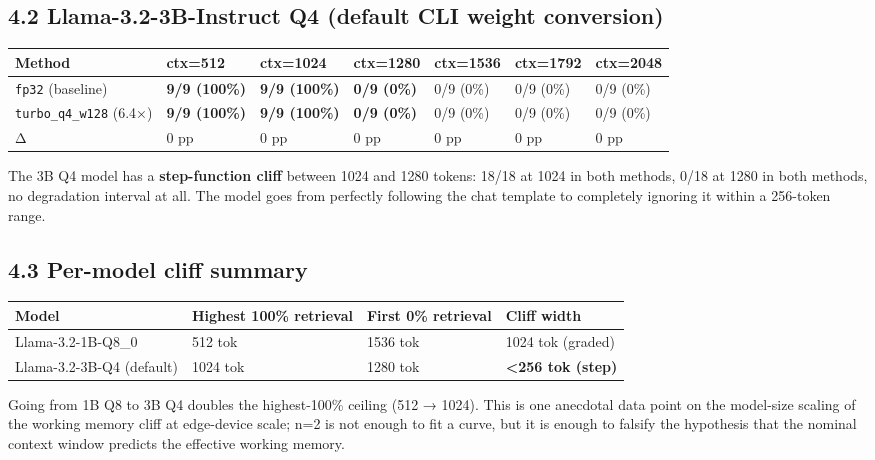 \documentclass[11pt]{article}
\begin{document}
\subsection*{4.2 Llama-3.2-3B-Instruct Q4 (default CLI weight conversion)}


\begin{center}
\begin{tabular}{lllllll}
\toprule
Method & ctx=512 & ctx=1024 & ctx=1280 & ctx=1536 & ctx=1792 & ctx=2048 \\
\midrule
\texttt{fp32} (baseline) & \textbf{9/9 (100\%)} & \textbf{9/9 (100\%)} & \textbf{0/9 (0\%)} & 0/9 (0\%) & 0/9 (0\%) & 0/9 (0\%) \\
\texttt{turbo\_q4\_w128} (6.4×) & \textbf{9/9 (100\%)} & \textbf{9/9 (100\%)} & \textbf{0/9 (0\%)} & 0/9 (0\%) & 0/9 (0\%) & 0/9 (0\%) \\
Δ & 0 pp & 0 pp & 0 pp & 0 pp & 0 pp & 0 pp \\
\bottomrule
\end{tabular}
\end{center}


The 3B Q4 model has a \textbf{step-function cliff} between 1024 and 1280 tokens: 18/18 at 1024 in both methods, 0/18 at 1280 in both methods, no degradation interval at all. The model goes from perfectly following the chat template to completely ignoring it within a 256-token range.


\subsection*{4.3 Per-model cliff summary}


\begin{center}
\begin{tabular}{llll}
\toprule
Model & Highest 100\% retrieval & First 0\% retrieval & Cliff width \\
\midrule
Llama-3.2-1B-Q8\_0 & 512 tok & 1536 tok & 1024 tok (graded) \\
Llama-3.2-3B-Q4 (default) & 1024 tok & 1280 tok & \textbf{<256 tok (step)} \\
\bottomrule
\end{tabular}
\end{center}


Going from 1B Q8 to 3B Q4 doubles the highest-100\% ceiling (512 → 1024). This is one anecdotal data point on the model-size scaling of the working memory cliff at edge-device scale; n=2 is not enough to fit a curve, but it is enough to falsify the hypothesis that the nominal context window predicts the effective working memory.
\end{document}
